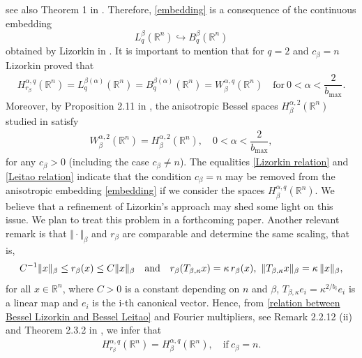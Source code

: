 \documentclass[10pt, leqno]{article}
\theoremstyle{definition}
\theoremstyle{remark}
\numberwithin{equation}{section}
\begin{document}
see also Theorem 1 in \cite{LONG-TRIEBEL}. Therefore, \eqref{embedding} is a consequence of the continuous embedding $$L^{\beta}_{q}(\mathbb{R}^{n}) \hookrightarrow B^{\beta}_{q}(\mathbb{R}^{n})$$
obtained by Lizorkin in \cite{LIZORKIN 3}. It is important to mention that for $q=2$ and $c_{\beta} = n$ Lizorkin proved that
\begin{eqnarray}
\label{Lizorkin relation}
H_{r_{\beta^{}}}^{\alpha, q}(\mathbb{R}^{n}) = L^{\beta(\alpha)}_{q}(\mathbb{R}^{n}) = B^{\beta(\alpha)}_{q}(\mathbb{R}^{n}) = W_{\beta}^{\alpha, q}(\mathbb{R}^{n}) \quad \text{for} \ 0 < \alpha < \dfrac{2}{b_{\max}}.
\end{eqnarray}
Moreover, by Proposition 2.11 in \cite{LEITAO LP}, the anisotropic Bessel spaces $H^{\alpha, 2}_{\beta}\left ( \mathbb{R}^{n} \right)$ studied in \cite{LEITAO LP} satisfy
\begin{eqnarray}
\label{Leitao relation}
W_{\beta}^{\alpha, 2}(\mathbb{R}^{n}) = H^{\alpha, 2}_{\beta} \left( \mathbb{R}^{n} \right), \quad 0 < \alpha < \dfrac{2}{b_{\max}},
\end{eqnarray}
for any $c_{\beta} > 0$ (including the case $c_{\beta} \neq n$). The equalities \eqref{Lizorkin relation} and \eqref{Leitao relation} indicate that the condition $c_{\beta} = n$ may be removed from the anisotropic embedding \eqref{embedding} if we consider the spaces $H^{\alpha, q}_{\beta}\left ( \mathbb{R}^{n} \right)$. We believe that a refinement of Lizorkin's approach may shed some light on this issue. We plan to treat this problem in a forthcoming paper. Another relevant remark is that $\Vert \cdot \Vert_{\beta}$ and $r_{\beta}$ are comparable and determine the same scaling, that is,
\begin{eqnarray}
\label{relation between Bessel Lizorkin and Bessel Leitao}
C^{-1}\Vert x \Vert_{\beta} \leq r_{\beta}(x) \leq C \Vert x \Vert_{\beta} \quad \text{and} \text \quad  r_{\beta}(T_{\beta, \kappa}x) = \kappa \, r_{\beta}(x),\  \Vert T_{\beta, \kappa}x \Vert_{\beta} = \kappa \, \Vert x \Vert_{\beta},
\end{eqnarray}
for all $x \in \mathbb{R}^{n}$, where $C>0$ is a constant depending on $n$ and $\beta$, $T_{\beta, \kappa}e_{i} = \kappa^{2/b_{i}} e_{i}$ is a linear map and $e_{i}$ is the i-th canonical vector. Hence, from \eqref{relation between Bessel Lizorkin and Bessel Leitao} and Fourier multipliers, see Remark 2.2.12 (ii) and Theorem 2.3.2 in \cite{BESSELFARKAS}, we infer that
\begin{eqnarray}
\label{equality Bessel Lizorkin and Bessel Leitao}
H_{r_{\beta^{}}}^{\alpha, q}\left( \mathbb{R}^{n} \right) = H^{\alpha, q}_{\beta}\left ( \mathbb{R}^{n} \right), \quad \text{if} \ c_{\beta} = n.
\end{eqnarray}
\end{document}
